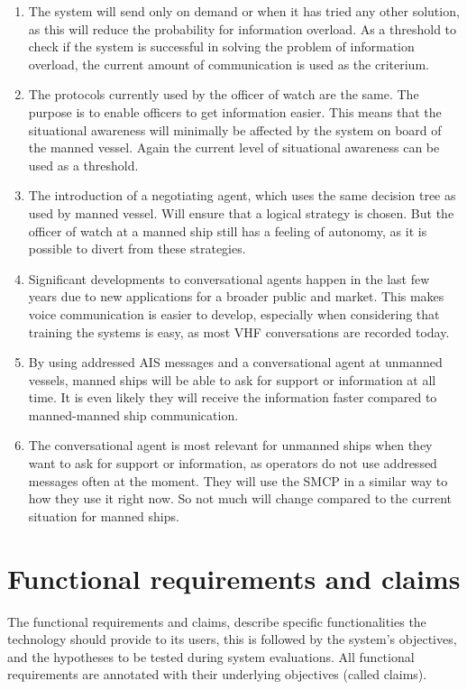 \begin{enumerate}
	\item The system will send only on demand or when it has tried any other solution, as this will reduce the probability for information overload. As a threshold to check if the system is successful in solving the problem of information overload, the current amount of communication is used as the criterium.
	\item The protocols currently used by the officer of watch are the same. The purpose is to enable officers to get information easier. This means that the situational awareness will minimally be affected by the system on board of the manned vessel. Again the current level of situational awareness can be used as a threshold.
	\item The introduction of a negotiating agent, which uses the same decision tree as used by manned vessel. Will ensure that a logical strategy is chosen. But the officer of watch at a manned ship still has a feeling of autonomy, as it is possible to divert from these strategies. 
	\item Significant developments to conversational agents happen in the last few years due to new applications for a broader public and market. This makes voice communication is easier to develop, especially when considering that training the systems is easy, as most \ac{VHF} conversations are recorded today.
	\item By using addressed \ac{AIS} messages and a conversational agent at unmanned vessels, manned ships will be able to ask for support or information at all time. It is even likely they will receive the information faster compared to manned-manned ship communication.
	\item The conversational agent is most relevant for unmanned ships when they want to ask for support or information, as operators do not use addressed messages often at the moment. They will use the \ac{SMCP} in a similar way to how they use it right now. So not much will change compared to the current situation for manned ships.
\end{enumerate}

\section{Functional requirements and claims}
The functional requirements and claims, describe specific functionalities the technology should provide to its users, this is followed by the system’s objectives, and the hypotheses to be tested during system evaluations. All functional requirements are annotated with their underlying objectives (called claims).


